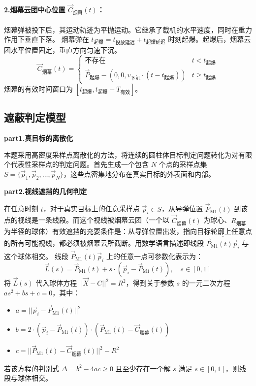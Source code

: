 \documentclass[5pt, withoutpreface,bwprint]{cumcmthesis} %
\begin{document}
\paragraph{2.烟幕云团中心位置 $\vec{C}_{\text{烟幕}}(t)$：}
烟幕弹被投下后，其运动轨迹为平抛运动。它继承了载机的水平速度，同时在重力作用下垂直下落。
烟幕弹在 $t_{\text{起爆}} = t_{\text{投放延迟}} + t_{\text{起爆延迟}}$ 时刻起爆。起爆后，烟幕云团水平位置固定，垂直方向匀速下沉。
\begin{equation}
    \vec{C}_{\text{烟幕}}(t) =
    \begin{cases}
    \text{不存在} & t < t_{\text{起爆}} \\
    \vec{P}_{\text{起爆}} - (0, 0, v_{\text{下沉}} \cdot (t - t_{\text{起爆}})) & t \ge t_{\text{起爆}}
    \end{cases}
\end{equation}
烟幕的有效时间窗口为 $[t_{\text{起爆}}, t_{\text{起爆}} + T_{\text{有效}}]$。
\subsection{遮蔽判定模型}

\textbf{part1.真目标的离散化}

本题采用高密度采样点离散化的方法，将连续的圆柱体目标判定问题转化为对有限个代表性采样点的判定问题。首先生成一个包含 $N$ 个点的采样点集 $S = \{\vec{p}_1, \vec{p}_2, \dots, \vec{p}_N\}$，这些点密集地分布在真实目标的外表面和内部。

\textbf{part2.视线遮挡的几何判定}

在任意时刻 $t$，对于真实目标上的任意采样点 $\vec{p}_i \in S$，从导弹位置 $\vec{P}_{\text{M1}}(t)$ 到该点的视线是一条线段。而这个视线被烟幕云团（一个以 $\vec{C}_{\text{烟幕}}(t)$ 为球心、$R_{\text{烟幕}}$ 为半径的球体）有效遮挡的充要条件是：从导弹位置出发，指向目标轮廓上任意点的所有可能视线，都必须被烟幕云所截断。用数学语言描述即线段 $\overline{\vec{P}_{\text{M1}}(t)\vec{p}_i}$ 与这个球体相交。
线段 $\overline{\vec{P}_{\text{M1}}(t)\vec{p}_i}$ 上的任意一点可参数化表示为：
\begin{equation}
    \vec{L}(s) = \vec{P}_{\text{M1}}(t) + s \cdot (\vec{p}_i - \vec{P}_{\text{M1}}(t)), \quad s \in [0, 1]
\end{equation}
将 $\vec{L}(s)$ 代入球体方程 $||\vec{X} - C||^2 = R^2$，得到关于参数 $s$ 的一元二次方程 $as^2 + bs + c = 0$，其中：
\begin{itemize}
    \item $a = ||\vec{p}_i - \vec{P}_{\text{M1}}(t)||^2$
    \item $b = 2 \cdot (\vec{p}_i - \vec{P}_{\text{M1}}(t)) \cdot (\vec{P}_{\text{M1}}(t) - \vec{C}_{\text{烟幕}}(t))$
    \item $c = ||\vec{P}_{\text{M1}}(t) - \vec{C}_{\text{烟幕}}(t)||^2 - R^2$
\end{itemize}
若该方程的判别式 $\Delta = b^2 - 4ac \ge 0$ 且至少存在一个解 $s$ 满足 $s \in [0, 1]$，则线段与球体相交。
\end{document}
